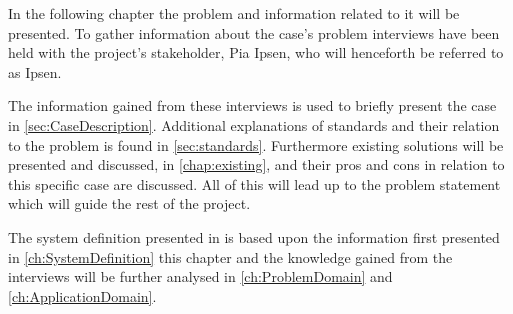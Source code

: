 In the following chapter the problem and information related to it will be presented.
To gather information about the case's problem interviews have been held with the project's stakeholder, Pia Ipsen, who will henceforth be referred to as Ipsen. 

The information gained from these interviews is used to briefly present the case in \cref{sec:CaseDescription}. 
Additional explanations of standards and their relation to the problem is found in \cref{sec:standards}.
Furthermore existing solutions will be presented and discussed, in \cref{chap:existing}, and their pros and cons in relation to this specific case are discussed.
All of this will lead up to the problem statement which will guide the rest of the project.

The system definition presented in  is based upon the information first presented in \cref{ch:SystemDefinition} this chapter and the knowledge gained from the interviews will be further analysed in \cref{ch:ProblemDomain} and \cref{ch:ApplicationDomain}.